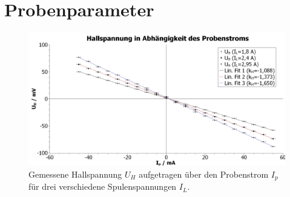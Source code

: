 \section{Probenparameter}
\begin{figure}[H]
    \centering
    \includegraphics[width=\textwidth]{scidavis/abbildungen/hallspannung.jpeg}
    \caption[Diagram der Messwerte $U_H(I_p)$]{Gemessene Hallspannung $U_H$ aufgetragen über den Probenstrom $I_p$ für drei verschiedene Spulenspannungen $I_L$.}%
    \label{fig:hallspannung}
\end{figure}

